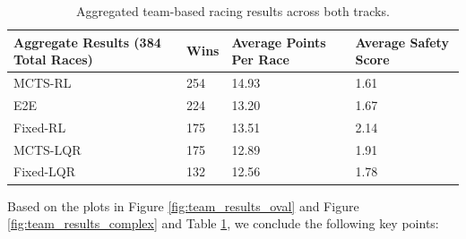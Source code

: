 \begin{table}[!ht]
    \centering
    \begin{tabular}{|p{4cm}|l|p{3.25cm}|p{3cm}|}
    \hline
        \textbf{Aggregate Results (384 Total Races)} & \textbf{Wins} & \textbf{Average Points Per Race} & \textbf{Average Safety Score} \\ \hline
        MCTS-RL & 254 & 14.93 & 1.61  \\ \hline
        E2E & 224 & 13.20 & 1.67  \\ \hline
        Fixed-RL & 175 & 13.51 & 2.14  \\ \hline
        MCTS-LQR & 175 & 12.89 & 1.91  \\ \hline
        Fixed-LQR & 132 & 12.56 & 1.78 \\ \hline
    \end{tabular}
    \caption[Aggregated team-based racing results.]{Aggregated team-based racing results across both tracks.}
    \label{tab:team_aggr_results}
\end{table}

Based on the plots in Figure \ref{fig:team_results_oval} and Figure \ref{fig:team_results_complex} and Table \ref{tab:team_aggr_results}, we conclude the following key points:

